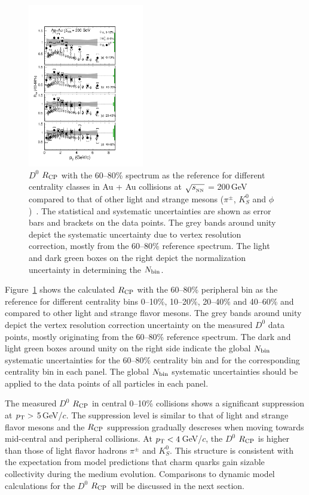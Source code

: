 \documentclass[%
 reprint,	
 amsmath,amssymb,
 aps,
 prc,
]{revtex4-1}
\begin{document}
\begin{figure}
\centering
\includegraphics[width=0.45\textwidth]{fig/D0_Rcp1.pdf}
\caption{$D^{0}$ $R_{\rm CP}$ with the 60--80\% spectrum as the reference for different centrality classes in Au + Au collisions at $\sqrt{s_{_{\rm NN}}}$ = 200\,GeV compared to that of other light and strange mesons ($\pi^{\pm}$, $K^0_{S}$ and $\phi$)~\cite{Adams2006_Identified,Abelev2009,Agakishiev2012}. The statistical and systematic uncertainties are shown as error bars and brackets on the data points. The grey bands around unity depict the systematic uncertainty due to vertex resolution correction, mostly from the 60--80\% reference spectrum. The light and dark green boxes on the right depict the normalization uncertainty in determining the $N_{\rm bin}$.}
\label{fig:D0_Rcp} 
\end{figure}

Figure~\ref{fig:D0_Rcp} shows the calculated $R_{\rm CP}$ with the 60--80\% peripheral bin as the reference for different centrality bins 0--10\%, 10--20\%, 20--40\% and 40--60\% and compared to other light and strange flavor mesons. The grey bands around unity depict the vertex resolution correction uncertainty on the measured $D^0$ data points, mostly originating from the 60--80\% reference spectrum. The dark and light green boxes around unity on the right side indicate the global $N_{\rm bin}$ systematic uncertainties for the 60--80\% centrality bin and for the corresponding centrality bin in each panel. The global $N_{\rm bin}$ systematic uncertainties should be applied to the data points of all particles in each panel.

The measured $D^0$ $R_{\rm CP}$ in central 0--10\% collisions shows a significant suppression at $p_{\rm T}>$ 5\,GeV/$c$. The suppression level is similar to that of light and strange flavor mesons and the $R_{\rm CP}$ suppression gradually descreses when moving towards mid-central and peripheral collisions. At $p_{\rm T}<4$\,GeV/$c$, the $D^0$ $R_{\rm CP}$ is higher than those of light flavor hadrons $\pi^{\pm}$ and $K_{S}^0$. This structure is consistent with the expectation from model predictions that charm quarks gain sizable collectivity during the medium evolution. Comparisons to dynamic model calculations for the $D^0$ $R_{\rm CP}$ will be discussed in the next section.
\end{document}
